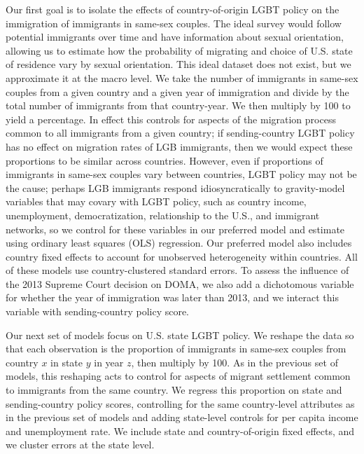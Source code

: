 \documentclass[
  11pt,
]{article}
\begin{document}
Our first goal is to isolate the effects of country-of-origin LGBT policy on the immigration of immigrants in same-sex couples. The ideal survey would follow potential immigrants over time and have information about sexual orientation, allowing us to estimate how the probability of migrating and choice of U.S. state of residence vary by sexual orientation. This ideal dataset does not exist, but we approximate it at the macro level. We take the number of immigrants in same-sex couples from a given country and a given year of immigration and divide by the total number of immigrants from that country-year. We then multiply by 100 to yield a percentage. In effect this controls for aspects of the migration process common to all immigrants from a given country; if sending-country LGBT policy has no effect on migration rates of LGB immigrants, then we would expect these proportions to be similar across countries. However, even if proportions of immigrants in same-sex couples vary between countries, LGBT policy may not be the cause; perhaps LGB immigrants respond idiosyncratically to gravity-model variables that may covary with LGBT policy, such as country income, unemployment, democratization, relationship to the U.S., and immigrant networks, so we control for these variables in our preferred model and estimate using ordinary least squares (OLS) regression. Our preferred model also includes country fixed effects to account for unobserved heterogeneity within countries. All of these models use country-clustered standard errors. To assess the influence of the 2013 Supreme Court decision on DOMA, we also add a dichotomous variable for whether the year of immigration was later than 2013, and we interact this variable with sending-country policy score.

Our next set of models focus on U.S. state LGBT policy. We reshape the data so that each observation is the proportion of immigrants in same-sex couples from country \(x\) in state \(y\) in year \(z\), then multiply by 100. As in the previous set of models, this reshaping acts to control for aspects of migrant settlement common to immigrants from the same country. We regress this proportion on state and sending-country policy scores, controlling for the same country-level attributes as in the previous set of models and adding state-level controls for per capita income and unemployment rate. We include state and country-of-origin fixed effects, and we cluster errors at the state level.
\end{document}
